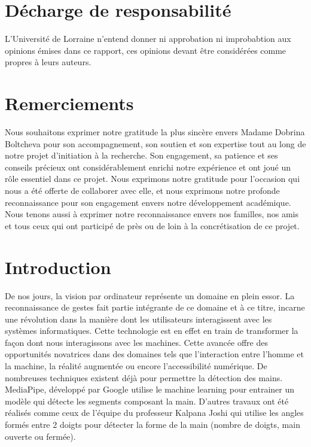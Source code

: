\documentclass[11pt]{article}
\begin{document}
\newpage \newpage
\section*{Décharge de responsabilité }\bigbreak
L'Université de Lorraine n'entend donner ni approbation  ni improbabtion aux opinions émises dans ce rapport,
ces opinions devant être considérées comme propres à leurs auteurs. \bigbreak

\newpage
\section*{Remerciements}
Nous souhaitons exprimer notre gratitude la plus sincère envers Madame Dobrina Boltcheva pour son accompagnement, son soutien et son expertise tout au long de notre projet d'initiation à la recherche. Son engagement, sa patience et ses conseils précieux ont considérablement enrichi notre expérience et ont joué un rôle essentiel dans ce projet. Nous exprimons notre gratitude pour l'occasion qui nous a été offerte de collaborer avec elle, et nous exprimons notre profonde reconnaissance pour son engagement envers notre développement académique. Nous tenons aussi à exprimer notre reconnaissance envers nos familles, nos amis et tous ceux qui ont participé de près ou de loin à la concrétisation de ce projet.

\newpage
\tableofcontents
\newpage

\setcounter{page}{1}
\section*{Introduction}
De nos jours, la vision par ordinateur représente un domaine en plein essor. La reconnaissance de gestes fait partie intégrante de ce domaine et à ce titre, incarne une révolution dans la manière dont les utilisateurs interagissent avec les systèmes informatiques. Cette technologie est en effet en train de transformer la façon dont nous interagissons avec les machines. Cette avancée offre des opportunités novatrices dans des domaines tels que l'interaction entre l'homme et la machine,
la réalité augmentée ou encore l'accessibilité numérique.
De nombreuses techniques existent déjà pour permettre la détection des mains. MediaPipe, développé par Google \cite{mediapipe} utilise le machine learning pour entrainer un modèle qui détecte les segments composant la main. D'autres travaux ont été réalisés comme ceux de l'équipe du professeur Kalpana Joshi \cite{joshi_static_2021} qui utilise les angles formés entre 2 doigts pour détecter la forme de la main (nombre de doigts, main ouverte ou fermée).\vspace{2mm}
\end{document}

